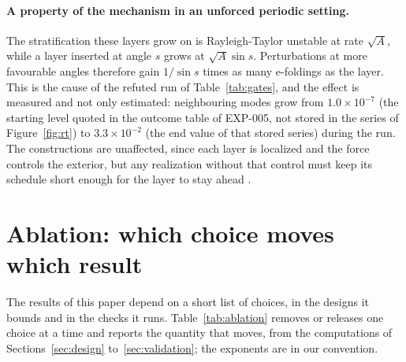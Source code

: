 \documentclass[11pt]{article}
\theoremstyle{remark}
\newcommand{\ev}[1]{\hspace{0.2em}{\small\textsf{[#1]}}}
\begin{document}
\paragraph{A property of the mechanism in an unforced periodic setting.} The stratification these
layers grow on is Rayleigh-Taylor unstable at rate $\sqrt A$, while a layer inserted at angle $s$
grows at $\sqrt A\sin s$. Perturbations at more favourable angles therefore gain $1/\sin s$ times as
many e-foldings as the layer. This is the cause of the refuted run of Table~\ref{tab:gates}, and the
effect is measured and not only estimated: neighbouring modes grow from $1.0\times10^{-7}$ (the starting level quoted in the outcome table of EXP-005, not stored in the series of Figure~\ref{fig:rt}) to
$3.3\times10^{-2}$ (the end value of that stored series) during the run. The constructions are unaffected, since each layer is localized and the
force controls the exterior, but any realization without that control must keep its schedule short
enough for the layer to stay ahead \ev{MV}.

\section{Ablation: which choice moves which result}\label{sec:ablation}

The results of this paper depend on a short list of choices, in the designs it bounds and in the checks it runs.
Table~\ref{tab:ablation} removes or releases one choice at a time and reports the quantity that moves, from the
computations of Sections~\ref{sec:design} to~\ref{sec:validation}; the exponents are in our convention.
\end{document}
